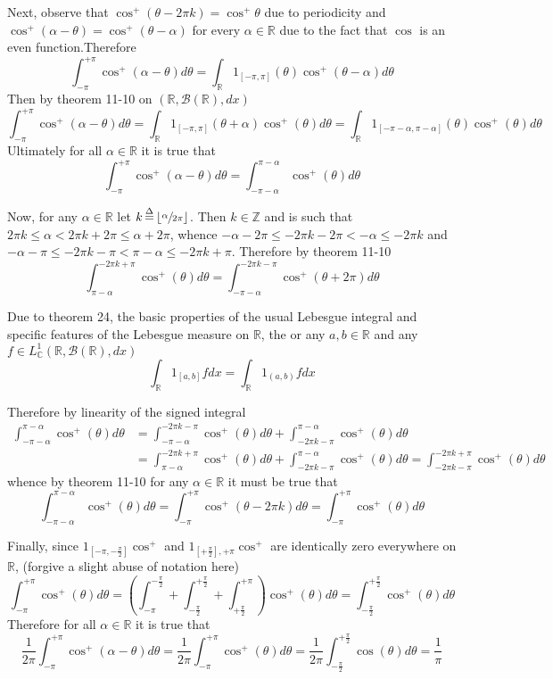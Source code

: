 \documentclass[a4paper]{article}
\newcommand{\clo}[1]{\left [ #1 \right ]}
\newcommand{\brac}[1]{\left ( #1 \right )}
\newcommand{\floor}[1]{\left\lfloor #1 \right\rfloor}
\newcommand{\Real}{\mathbb{R}}
\newcommand{\Cplx}{\mathbb{C}}
\newcommand{\borel}[1]{\mathcal{B}\brac{#1}}
\newcommand{\defn}{\mathop{\overset{\Delta}{=}}\nolimits}
\begin{document}
Next, observe that $\cos^+\brac{\theta-2\pi k} = \cos^+\theta$ due to periodicity and $\cos^+\brac{\alpha - \theta} = \cos^+\brac{\theta-\alpha}$ for every $\alpha\in \Real$ due to the fact that $\cos$ is an even function.Therefore \[\int_{-\pi}^{+\pi} \cos^+\brac{\alpha - \theta} d\theta = \int_\Real 1_{\clo{-\pi, \pi}}\brac{\theta} \cos^+\brac{\theta-\alpha} d\theta\] Then by theorem 11-10 on $\brac{\Real, \borel{\Real}, dx}$ \[\int_{-\pi}^{+\pi} \cos^+\brac{\alpha - \theta} d\theta = \int_\Real 1_{\clo{-\pi, \pi}}\brac{\theta+\alpha} \cos^+\brac{\theta} d\theta = \int_\Real 1_{\clo{-\pi-\alpha, \pi-\alpha}}\brac{\theta} \cos^+\brac{\theta} d\theta\] Ultimately for all $\alpha\in \Real$ it is true that \[\int_{-\pi}^{+\pi} \cos^+\brac{\alpha - \theta} d\theta = \int_{-\pi-\alpha}^{\pi-\alpha} \cos^+\brac{\theta} d\theta \]

Now, for any $\alpha\in \Real$ let $k\defn \floor{\sfrac{\alpha}{2\pi}}$. Then $k\in \mathbb{Z}$ and is such that $2\pi k\leq \alpha < 2\pi k + 2\pi\leq \alpha + 2\pi$, whence $-\alpha - 2\pi \leq -2\pi k - 2\pi< -\alpha \leq -2\pi k$ and $-\alpha - \pi \leq -2\pi k - \pi< \pi-\alpha \leq -2\pi k+\pi$. Therefore by theorem 11-10 \[\int_{\pi-\alpha}^{-2\pi k+\pi} \cos^+\brac{\theta} d\theta = \int_{-\pi-\alpha}^{-2\pi k-\pi} \cos^+\brac{\theta+2\pi} d\theta\]

Due to theorem 24, the basic properties of the usual Lebesgue integral and specific features of the Lebesgue measure on $\Real$, the or any $a,b\in \Real$ and any $f\in L^1_\Cplx\brac{\Real, \borel{\Real}, dx}$ \[\int_\Real 1_{\clo{a,b}} f dx = \int_\Real 1_{\brac{a,b}} f dx\] 

Therefore by linearity of the signed integral\begin{align*} \int_{-\pi-\alpha}^{\pi-\alpha} \cos^+\brac{\theta} d\theta &= \int_{-\pi-\alpha}^{-2\pi k-\pi} \cos^+\brac{\theta} d\theta + \int_{-2\pi k-\pi}^{\pi-\alpha} \cos^+\brac{\theta} d\theta \\&= \int_{\pi-\alpha}^{-2\pi k+\pi} \cos^+\brac{\theta} d\theta + \int_{-2\pi k-\pi}^{\pi-\alpha} \cos^+\brac{\theta} d\theta = \int_{-2\pi k-\pi}^{-2\pi k+\pi} \cos^+\brac{\theta} d\theta\end{align*}  whence by theorem 11-10 for any $\alpha\in \Real$ it must be true that \[\int_{-\pi-\alpha}^{\pi-\alpha} \cos^+\brac{\theta} d\theta = \int_{-\pi}^{+\pi} \cos^+\brac{\theta-2\pi k} d\theta = \int_{-\pi}^{+\pi} \cos^+\brac{\theta} d\theta\]

Finally, since $1_{\clo{-\pi,-\frac{\pi}{2}}}\cos^+$ and $1_{\clo{+\frac{\pi}{2}},+\pi}\cos^+$ are identically zero everywhere on $\Real$, (forgive a slight abuse of notation here) \[\int_{-\pi}^{+\pi} \cos^+\brac{\theta} d\theta = \brac{\int_{-\pi}^{-\frac{\pi}{2}} + \int_{-\frac{\pi}{2}}^{+\frac{\pi}{2}} + \int_{+\frac{\pi}{2}}^{+\pi}  } \cos^+\brac{\theta} d\theta = \int_{-\frac{\pi}{2}}^{+\frac{\pi}{2}} \cos^+\brac{\theta} d\theta\] Therefore for all $\alpha\in \Real$ it is true that \[\frac{1}{2\pi}\int_{-\pi}^{+\pi} \cos^+\brac{\alpha - \theta} d\theta = \frac{1}{2\pi} \int_{-\pi}^{+\pi} \cos^+\brac{\theta} d\theta = \frac{1}{2\pi}\int_{-\frac{\pi}{2}}^{+\frac{\pi}{2}} \cos\brac{\theta} d\theta = \frac{1}{\pi}\]
\end{document}
